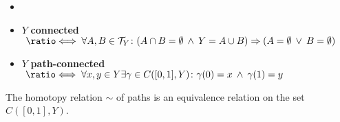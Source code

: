 \begin{defin} \label{def:connectedness}
  \begin{itemize}
    \item[] %
    \item $Y$ \textbf{connected} $\;\longeq\; \forall A,B \in \T_Y\colon (A \cap B = \emptyset \: \land \: Y = A \cup B) \Rightarrow (A = \emptyset \: \lor \: B = \emptyset)$
    \item $Y$ \textbf{path-connected} $\;\longeq\; \forall x,y \in Y \exists\gamma \in C([0,1], Y)\colon \gamma(0) = x \: \land \: \gamma(1) = y$
  \end{itemize}
\end{defin}

\begin{lemma} \label{lem:homotopy-equivalence}
  The homotopy relation $\sim$ of paths is an equivalence relation on the set $C([0,1],Y)$.
\end{lemma}

